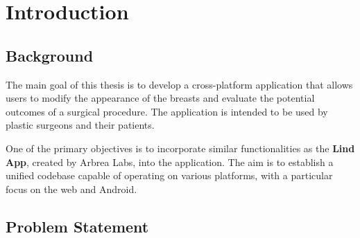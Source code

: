 \setcounter{chapter}{0}

\chapter{Introduction}

\section{Background}

The main goal of this thesis is to develop a cross-platform application that allows users to modify the appearance of the breasts and evaluate the potential outcomes of a surgical procedure. 
The application is intended to be used by plastic surgeons and their patients. 

One of the primary objectives is to incorporate similar functionalities as the \textbf{Lind App}, created by Arbrea Labs, into the application. 
The aim is to establish a unified codebase capable of operating on various platforms, with a particular focus on the web and Android.



\section{Problem Statement}

